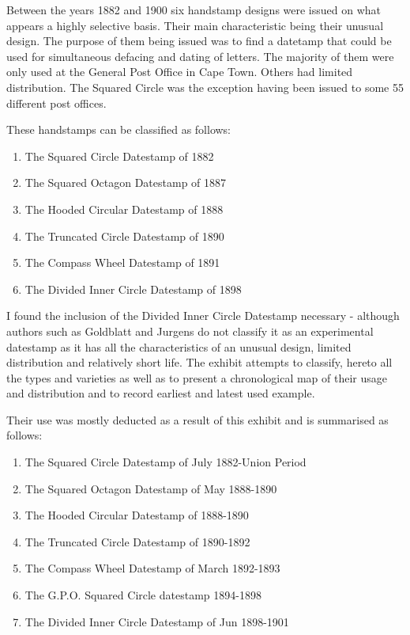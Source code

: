 Between the years 1882 and 1900 six handstamp designs were issued on  	 
what appears a highly selective basis. Their main characteristic 
being their unusual design. The purpose of them being issued was 
to find a datetamp that could be used for simultaneous defacing 
and dating of letters. The majority of them were only used at the General 
Post Office in Cape Town.  Others had limited distribution. 
The Squared Circle was the exception having been issued to some 
55 different post offices.


These handstamps can be classified as follows:

   
\begin{enumerate}
\item The Squared Circle Datestamp of 1882
\item The Squared Octagon Datestamp of 1887
\item The Hooded Circular Datestamp of 1888
\item The Truncated Circle Datestamp of 1890
\item The Compass Wheel Datestamp of 1891
\item The Divided Inner Circle Datestamp of 1898
\end{enumerate}

I found the inclusion of the Divided Inner Circle Datestamp necessary - 
although authors such as Goldblatt and Jurgens do not classify 
it as an experimental datestamp  as it has all the characteristics 
of an unusual design, limited distribution and relatively short life. 
The exhibit attempts to classify, hereto all the types and varieties 
as well as to present a chronological map of their usage and 
distribution and to record earliest and latest used example.

Their use was mostly deducted as a result of this exhibit and is 
summarised as follows:



\begin{enumerate}
\item The Squared Circle Datestamp of July 1882-Union Period
\item The Squared Octagon Datestamp of May 1888-1890
\item The Hooded Circular Datestamp of 1888-1890
\item The Truncated Circle Datestamp of 1890-1892
\item The Compass Wheel Datestamp of March 1892-1893
\item The G.P.O. Squared Circle datestamp 1894-1898
\item The Divided Inner Circle Datestamp of Jun 1898-1901
\end{enumerate}

